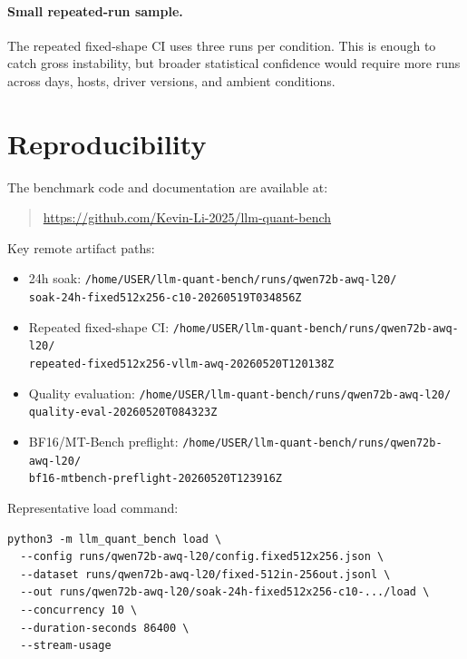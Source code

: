 \documentclass[11pt]{article}
\begin{document}
\paragraph{Small repeated-run sample.}
The repeated fixed-shape CI uses three runs per condition. This is enough to
catch gross instability, but broader statistical confidence would require more
runs across days, hosts, driver versions, and ambient conditions.

\section{Reproducibility}

The benchmark code and documentation are available at:

\begin{quote}
\url{https://github.com/Kevin-Li-2025/llm-quant-bench}
\end{quote}

Key remote artifact paths:

\begin{itemize}
  \item 24h soak:
        \texttt{/home/USER/llm-quant-bench/runs/qwen72b-awq-l20/}\\
        \texttt{soak-24h-fixed512x256-c10-20260519T034856Z}
  \item Repeated fixed-shape CI:
        \texttt{/home/USER/llm-quant-bench/runs/qwen72b-awq-l20/}\\
        \texttt{repeated-fixed512x256-vllm-awq-20260520T120138Z}
  \item Quality evaluation:
        \texttt{/home/USER/llm-quant-bench/runs/qwen72b-awq-l20/}\\
        \texttt{quality-eval-20260520T084323Z}
  \item BF16/MT-Bench preflight:
        \texttt{/home/USER/llm-quant-bench/runs/qwen72b-awq-l20/}\\
        \texttt{bf16-mtbench-preflight-20260520T123916Z}
\end{itemize}

Representative load command:

\begin{verbatim}
python3 -m llm_quant_bench load \
  --config runs/qwen72b-awq-l20/config.fixed512x256.json \
  --dataset runs/qwen72b-awq-l20/fixed-512in-256out.jsonl \
  --out runs/qwen72b-awq-l20/soak-24h-fixed512x256-c10-.../load \
  --concurrency 10 \
  --duration-seconds 86400 \
  --stream-usage
\end{verbatim}
\end{document}
